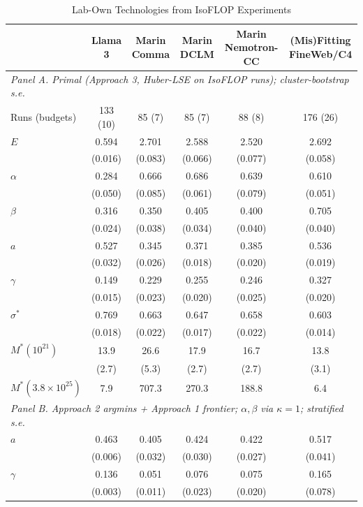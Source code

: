 \begin{table}[!htbp]
\centering
\scriptsize
\caption{Lab-Own Technologies from IsoFLOP Experiments}
\label{tab:m1_labs}
\begin{threeparttable}
\begin{tabular}{lccccc}
\toprule
 & Llama 3 & Marin Comma & Marin DCLM & Marin Nemotron-CC & (Mis)Fitting FineWeb/C4 \\
\midrule
\multicolumn{6}{l}{\textit{Panel A. Primal (Approach 3, Huber-LSE on IsoFLOP runs); cluster-bootstrap s.e.}} \\
Runs (budgets) & 133 (10) & 85 (7) & 85 (7) & 88 (8) & 176 (26) \\
$E$ & 0.594 & 2.701 & 2.588 & 2.520 & 2.692 \\
 & (0.016) & (0.083) & (0.066) & (0.077) & (0.058) \\
$\alpha$ & 0.284 & 0.666 & 0.686 & 0.639 & 0.610 \\
 & (0.050) & (0.085) & (0.061) & (0.079) & (0.051) \\
$\beta$ & 0.316 & 0.350 & 0.405 & 0.400 & 0.705 \\
 & (0.024) & (0.038) & (0.034) & (0.040) & (0.040) \\
$a$ & 0.527 & 0.345 & 0.371 & 0.385 & 0.536 \\
 & (0.032) & (0.026) & (0.018) & (0.020) & (0.019) \\
$\gamma$ & 0.149 & 0.229 & 0.255 & 0.246 & 0.327 \\
 & (0.015) & (0.023) & (0.020) & (0.025) & (0.020) \\
$\sigma^*$ & 0.769 & 0.663 & 0.647 & 0.658 & 0.603 \\
 & (0.018) & (0.022) & (0.017) & (0.022) & (0.014) \\
$M^*(10^{21})$ & 13.9 & 26.6 & 17.9 & 16.7 & 13.8 \\
 & (2.7) & (5.3) & (2.7) & (2.7) & (3.1) \\
$M^*(3.8\times10^{25})$ & 7.9 & 707.3 & 270.3 & 188.8 & 6.4 \\
\multicolumn{6}{l}{\textit{Panel B. Approach 2 argmins + Approach 1 frontier; $\alpha,\beta$ via $\kappa=1$; stratified s.e.}} \\
$a$ & 0.463 & 0.405 & 0.424 & 0.422 & 0.517 \\
 & (0.006) & (0.032) & (0.030) & (0.027) & (0.041) \\
$\gamma$ & 0.136 & 0.051 & 0.076 & 0.075 & 0.165 \\
 & (0.003) & (0.011) & (0.023) & (0.020) & (0.078) \\

\end{tabular}
\end{threeparttable}
\end{table}
